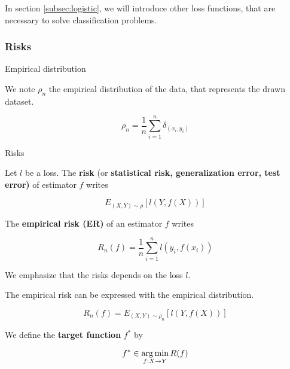 \documentclass[
10pt, %
a4paper, %
oneside, %
headinclude,footinclude, %
BCOR5mm, %
]{scrartcl}
\begin{document}
In section \ref{subsec:logistic}, we will introduce other loss functions, that are necessary to solve classification problems.

\subsubsection{\large\color{Periwinkle}Risks}

\begin{definition}{Empirical distribution}

    We note $\rho_n$ the empirical distribution of the data, that represents the drawn dataset.

    \begin{equation}
	\rho_n = \frac{1}{n} \sum^{n}_{i=1} \delta_{(x_i, y_i)}
    \end{equation}
\end{definition}

\begin{definition}{Risks}

    Let $l$ be a loss. The \textbf{{risk}} (or \textbf{{statistical risk, generalization error, test error)}} of estimator $f$ writes

    \begin{equation}
        E_{(X,Y)\sim \rho}[l(Y,f(X))]
    \end{equation}

    The \textbf{{empirical risk (ER)}} of an estimator $f$ writes

    \begin{equation}
	R_n(f) = \frac{1}{n} \sum^{n}_{i=1} l(y_i, f(x_i))
    \end{equation}

    We emphasize that the risks depends on the loss $l$.
\end{definition}

\begin{remark}

    The empirical risk can be expressed with the empirical distribution.

    \begin{equation}
        R_n(f)=E_{(X,Y)\sim \rho_n}[l(Y,f(X))]
    \end{equation}
\end{remark}

We define the \textbf{{target function}} $f^*$ by

\begin{equation}
    f^*\in \operatorname*{arg\,min}_{f:X\rightarrow Y} R(f)
\end{equation}
\end{document}
